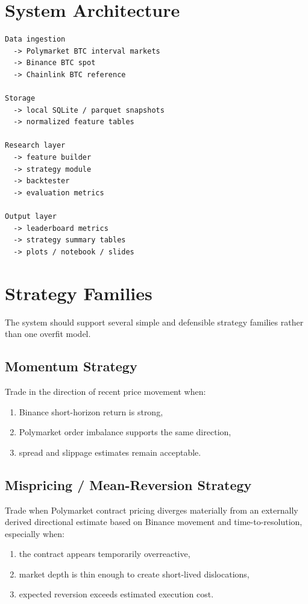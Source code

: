 \documentclass[11pt, letterpaper]{article}
\begin{document}
\section{System Architecture}

\begin{lstlisting}[title={Hackathon Architecture}]
Data ingestion
  -> Polymarket BTC interval markets
  -> Binance BTC spot
  -> Chainlink BTC reference

Storage
  -> local SQLite / parquet snapshots
  -> normalized feature tables

Research layer
  -> feature builder
  -> strategy module
  -> backtester
  -> evaluation metrics

Output layer
  -> leaderboard metrics
  -> strategy summary tables
  -> plots / notebook / slides
\end{lstlisting}

\section{Strategy Families}

The system should support several simple and defensible strategy families rather than one overfit model.

\subsection{Momentum Strategy}

Trade in the direction of recent price movement when:

\begin{enumerate}[nosep]
    \item Binance short-horizon return is strong,
    \item Polymarket order imbalance supports the same direction,
    \item spread and slippage estimates remain acceptable.
\end{enumerate}

\subsection{Mispricing / Mean-Reversion Strategy}

Trade when Polymarket contract pricing diverges materially from an externally derived directional estimate based on Binance movement and time-to-resolution, especially when:

\begin{enumerate}[nosep]
    \item the contract appears temporarily overreactive,
    \item market depth is thin enough to create short-lived dislocations,
    \item expected reversion exceeds estimated execution cost.
\end{enumerate}
\end{document}
